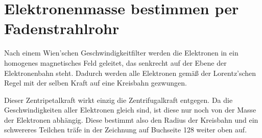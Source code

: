 




%
%	





\section{Elektronenmasse bestimmen per Fadenstrahlrohr}

Nach einem Wien'schen Geschwindigkeitfilter werden die Elektronen in ein homogenes magnetisches Feld geleitet, das senkrecht auf der Ebene der Elektronenbahn steht. Dadurch werden alle Elektronen gemäß der Lorentz'schen Regel mit der selben Kraft auf eine Kreisbahn gezwungen.\label{Kreisbahn}

Dieser Zentripetalkraft wirkt einzig die Zentrifugalkraft entgegen. Da die Geschwindigkeiten aller Elektronen gleich sind, ist diese nur noch von der Masse der Elektronen abhängig. Diese bestimmt also den Radius der Kreisbahn und ein schwereres Teilchen träfe in der Zeichnung auf Buchseite 128 weiter oben auf.
